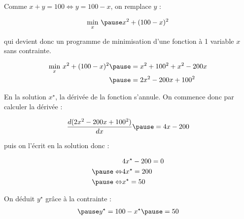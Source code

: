 \documentclass[9pt,handout,professionalfonts,hyperref]{beamer}
\begin{document}
\begin{frame}

	Comme
	$x+y=100  \Leftrightarrow y=100-x
	$, on remplace $y$ :

	\[\begin{aligned}
	\underset{x}{\min}~\pause x^2 + (100-x)^2
	\end{aligned}\]

	qui devient donc un programme de minimisation d'une fonction à 1 variable $x$ sans contrainte.

\end{frame}

\begin{frame}
	\[\begin{aligned}
	\underset{x}{\min}~x^2 + (100-x)^2  \pause &= x^2 + 100^2 + x^2 - 200x \\\pause &= 2x^2 -200x + 100^2
	\end{aligned}\]

\pause 	En la solution $x^\star$, la dérivée de la fonction s'annule. On commence donc par calculer la dérivée :

	\[\begin{aligned}
	\frac{d(2x^2 -200x + 100^2)}{dx} \pause = 4x -200
	\end{aligned}\]

\pause puis on l'écrit en la solution donc :

	\[\begin{aligned}
	&4x^\star -200=0\\
	\pause \Leftrightarrow&4x^\star=200\\
	\pause \Leftrightarrow&x^\star=50\\
	\end{aligned}\]

	On déduit $y^\star$ grâce à la contrainte :
	\[\begin{aligned}
	\pause y^\star=100-x^\star \pause = 50
	\end{aligned}\]

\end{frame}
\end{document}
